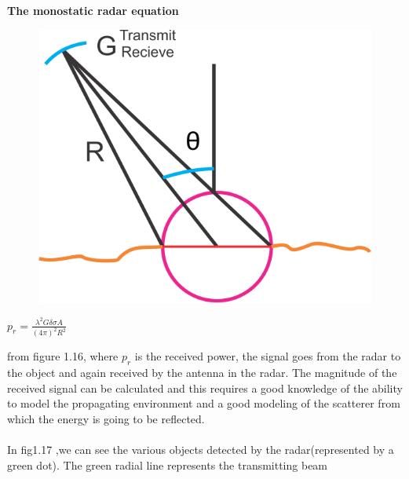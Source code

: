 \textbf{The monostatic radar equation}
\begin{figure}[h]
\centering
\includegraphics[scale=0.4]{./graphics/new1}
\caption{}
\end{figure}
\begin{center}
$p_{r}= \frac{\lambda^{2} G \delta \sigma A}{(4\pi)^{2}R^{2}}$
\end{center}
from figure 1.16, where $p_{r}$ is the received power, the signal goes from the radar to the object and again received by the antenna in the radar. The magnitude of the received signal can be calculated and this requires a good knowledge of the ability to model the propagating environment and a good modeling of the scatterer from which the energy is going to be reflected.\\\\

In fig1.17 ,we can see the various objects detected by the radar(represented by a green dot). The green radial line represents the transmitting beam\\\\

